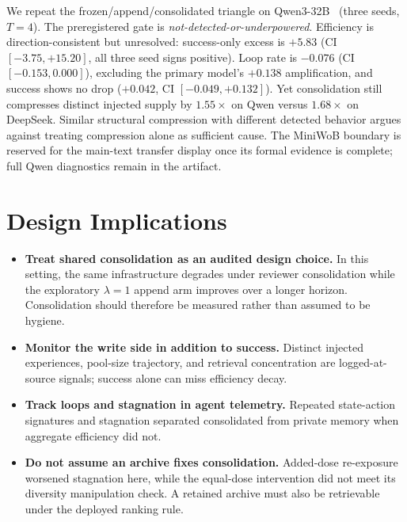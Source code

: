 \documentclass[letterpaper]{article} %
\begin{document}
We repeat the frozen/append/consolidated triangle on Qwen3-32B~\citep{yang2025qwen3}
(three seeds, $T{=}4$). The preregistered gate is
\emph{not-detected-or-underpowered}. Efficiency is direction-consistent but unresolved:
success-only excess is $+5.83$ (CI $[-3.75,+15.20]$, all three seed signs positive).
Loop rate is $-0.076$ (CI $[-0.153,0.000]$), excluding the primary model's
$+0.138$ amplification, and success shows no drop ($+0.042$, CI $[-0.049,+0.132]$).
Yet consolidation still compresses distinct injected supply by $1.55\times$ on Qwen versus
$1.68\times$ on DeepSeek. Similar structural compression with different detected behavior
argues against treating compression alone as sufficient cause. The MiniWoB boundary is
reserved for the main-text transfer display once its formal evidence is complete; full Qwen
diagnostics remain in the artifact.


\section{Design Implications}

\begin{itemize}
\item \textbf{Treat shared consolidation as an audited design choice.} In this setting, the
same infrastructure degrades under reviewer consolidation while the exploratory
$\lambda{=}1$ append arm improves over a longer horizon. Consolidation should therefore be
measured rather than assumed to be hygiene.
\item \textbf{Monitor the write side in addition to success.} Distinct injected experiences,
pool-size trajectory, and retrieval concentration are logged-at-source signals; success alone
can miss efficiency decay.
\item \textbf{Track loops and stagnation in agent telemetry.} Repeated state-action
signatures and stagnation separated consolidated from private memory when aggregate efficiency
did not.
\item \textbf{Do not assume an archive fixes consolidation.} Added-dose re-exposure worsened
stagnation here, while the equal-dose intervention did not meet its diversity manipulation
check. A retained archive must also be retrievable under the deployed ranking rule.
\end{itemize}
\end{document}
